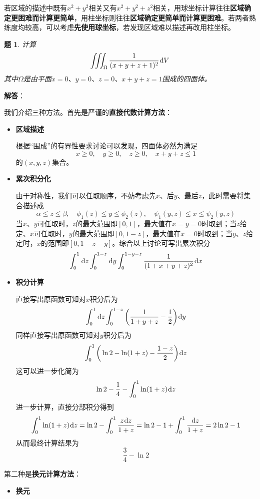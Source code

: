 \documentclass[a4paper,UTF8,fontset=windows,AutoFakeBold]{ctexart}
\newcommand*{\dr}{\hspace{0.07em}\mathrm{d}}
\newcommand*{\note}{\noindent *}
\theoremstyle{ex}
\newtheorem{exercise}{题}
\newcommand{\sol}[1]{{\vspace{5pt}\kaishu\noindent\textbf{解答}：\vspace{-3pt}
\begin{compactitem}
    \item[] #1
\end{compactitem}
}}
\begin{document}
\note 若区域的描述中既有$x^2+y^2$相关又有$x^2+y^2+z^2$相关，用球坐标计算往往\textbf{区域确定更困难而计算更简单}，用柱坐标则往往\textbf{区域确定更简单而计算更困难}。若两者熟练度均较高，可以考虑\textbf{先使用球坐标}，若发现区域难以描述再改用柱坐标。

\begin{framed}
\begin{exercise}
    计算
    $$\iiint_\Omega\frac{1}{(x+y+z+1)^2}\dr V$$
    其中$\Omega$是由平面$x=0$、$y=0$、$z=0$、$x+y+z=1$围成的四面体。
\end{exercise}
\sol{
    我们介绍三种方法。首先是严谨的\textbf{直接代数计算方法}：
    \begin{itemize}
        \item \textbf{区域描述}
        
        根据``围成''的有界性要求讨论可以发现，四面体必然为满足
        $$x\ge0,\quad y\ge0,\quad z\ge0,\quad x+y+z\le1$$
        的$(x,y,z)$集合。

        \item \textbf{累次积分化}
        
        由于对称性，我们可以任取顺序，不妨考虑先$x$、后$y$、最后$z$，此时需要将集合描述成
        $$\alpha\le z\le\beta,\quad\phi_1(z)\le y\le\phi_2(z),\quad\psi_1(y,z)\le x\le\psi_2(y,z)$$
        当$x$、$y$可任取时，$z$的最大范围即$[0,1]$，最大值在$x=y=0$时取到；当$z$给定、$x$可任取时，$y$的最大范围即$[0,1-z]$，最大值在$x=0$时取到；当$y$、$z$给定时，$x$的范围即$[0,1-z-y]$。综合以上讨论可写出累次积分
        $$\int_0^1\dr z\int_0^{1-z}\dr y\int_0^{1-y-z}\frac{1}{(1+x+y+z)^2}\dr x$$

        \item \textbf{积分计算}
        
        直接写出原函数可知对$x$积分后为
        $$\int_0^1\dr z\int_0^{1-z}\bigg(\frac{1}{1+y+z}-\frac{1}{2}\bigg)\dr y$$
        同样直接写出原函数可知对$y$积分后为
        $$\int_0^1\bigg(\ln2-\ln(1+z)-\frac{1-z}{2}\bigg)\dr z$$
        这可以进一步化简为
        $$\ln 2-\frac{1}{4}-\int_0^1\ln(1+z)\dr z$$
        进一步计算，直接分部积分得到
        $$\int_0^1\ln(1+z)\dr z=\ln2-\int_0^1\frac{z\dr z}{1+z}=\ln2-1+\int_0^1\frac{\dr z}{1+z}=2\ln2-1$$
        从而最终计算结果为
        $$\frac{3}{4}-\ln2$$
    \end{itemize}
    
    第二种是\textbf{换元计算方法}：
    \begin{itemize}
        \item \textbf{换元}
        

\end{itemize}}
\end{framed}
\end{document}
